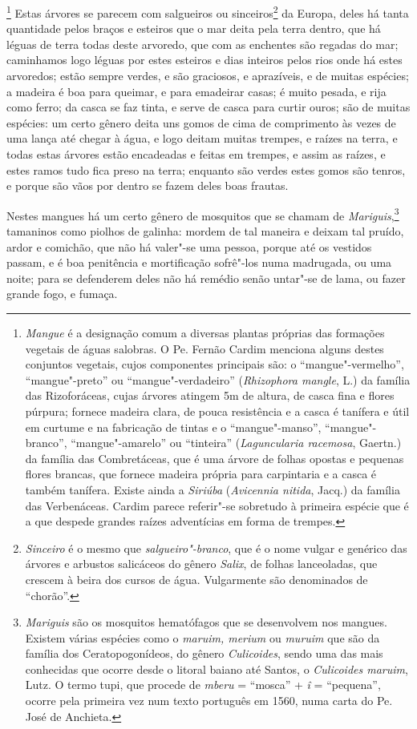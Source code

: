 \footnote{ \textit{Mangue} é a designação
comum a diversas plantas próprias das formações vegetais de águas
salobras. O Pe. Fernão Cardim menciona alguns destes conjuntos
vegetais, cujos componentes principais são: o ``mangue"-vermelho'', 
``mangue"-preto'' ou ``mangue"-verdadeiro'' (\textit{Rhizophora mangle}, L.)
da família das Rizoforáceas, cujas árvores atingem 5m de altura, de
casca fina e flores púrpura; fornece madeira clara, de pouca
resistência e a casca é tanífera e útil em curtume e na fabricação de
tintas e o ``mangue"-manso'', ``mangue"-branco'', ``mangue"-amarelo'' ou
``tinteira'' (\textit{Laguncularia racemosa}, Gaertn.) da família das
Combretáceas, que é uma árvore de folhas opostas e pequenas flores
brancas, que fornece madeira própria para carpintaria e a casca é
também tanífera. Existe ainda a \textit{Siriúba} (\textit{Avicennia
nitida}, Jacq.) da família das Verbenáceas. Cardim parece referir"-se
sobretudo à primeira espécie que é a que despede grandes raízes
adventícias em forma de trempes.} Estas árvores se parecem
com salgueiros ou sinceiros\footnote{ \textit{Sinceiro} é o mesmo que
\textit{salgueiro"-branco}, que é o nome vulgar e genérico das árvores e
arbustos salicáceos do gênero \textit{Salix}, de folhas lanceoladas,
que crescem à beira dos cursos de água. Vulgarmente são denominados de
``chorão''.} da Europa, deles há tanta quantidade pelos braços e esteiros
que o mar deita pela terra dentro, que há léguas de terra todas deste
arvoredo, que com as enchentes são regadas do mar; caminhamos logo
léguas por estes esteiros e dias inteiros pelos rios onde há estes
arvoredos; estão sempre verdes, e são graciosos, e aprazíveis, e de
muitas espécies; a madeira é boa para queimar, e para emadeirar casas;
é muito pesada, e rija como ferro; da casca se faz tinta, e serve de
casca para curtir ouros; são de muitas espécies: um certo gênero deita
uns gomos de cima de comprimento às vezes de uma lança até chegar à
água, e logo deitam muitas trempes, e raízes na terra, e todas estas
árvores estão encadeadas e feitas em trempes, e assim as raízes, e
estes ramos tudo fica preso na terra; enquanto são verdes estes gomos
são tenros, e porque são vãos por dentro se fazem deles boas frautas.

 Nestes mangues há um certo gênero de mosquitos que se chamam de
\textit{Mariguis},\footnote{ \textit{Mariguis} são os mosquitos
hematófagos que se desenvolvem nos mangues. Existem várias espécies
como o \textit{maruim, merium} ou \textit{muruim} que são da família
dos Ceratopogonídeos, do gênero \textit{Culicoides}, sendo uma das mais
conhecidas que ocorre desde o litoral baiano até Santos, o
\textit{Culicoides maruim}, Lutz. O termo tupi, que procede de
\textit{mberu} = ``mosca'' + \textit{î} = ``pequena'', ocorre pela primeira
vez num texto português em 1560, numa carta do Pe. José de
Anchieta.} tamaninos como piolhos de galinha: mordem de tal maneira e
deixam tal pruído, ardor e comichão, que não há valer"-se uma pessoa,
porque até os vestidos passam, e é boa penitência e mortificação
sofrê"-los numa madrugada, ou uma noite; para se defenderem deles não há
remédio senão untar"-se de lama, ou fazer grande fogo, e fumaça.

